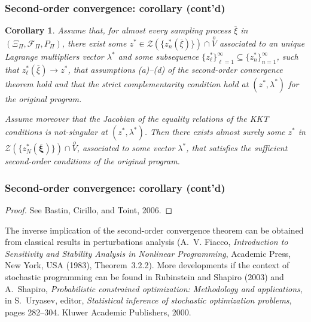 \documentclass{beamer}
\newtheorem{coro}{Corollary}
\def\bxi{\boldsymbol\xi}
\begin{document}
\begin{frame}
\frametitle{Second-order convergence: corollary (cont'd)}

\begin{coro}
Assume that, for almost every sampling process $\overline{\xi}$ in $(\Xi_{\Pi}, \mathcal{F}_{\Pi}, P_{\Pi})$, there exist some $z^* \in \mathcal{Z} \left(\lbrace
  z^*_n(\overline{\xi})\rbrace\right) \cap \overset{o}{V}$ associated to an unique Lagrange multipliers vector $\lambda^*$ and some subsequence
 $\lbrace z_{\ell}^* \rbrace_{\ell = 1}^{\infty} \subseteq \lbrace  z_n^* \rbrace_{n = 1}^{\infty}$, such that $z^*_{\ell}(\overline{\xi}) \rightarrow z^*$, that assumptions (a)--(d) of the second-order convergence theorem hold and that the strict complementarity condition hold at $( z^*, \lambda^* )$ for the original program.

\mbox{}

Assume moreover that the Jacobian of the equality relations of the KKT conditions is not-singular at $( z^*, \lambda^* )$.
Then there exists almost surely some $z^*$ in $\mathcal{Z} \left(
\lbrace z_N^*(\overline{\bxi}) \rbrace \right) \cap \overset{o}{V}$,
associated to some vector $\lambda^*$, that satisfies the sufficient second-order conditions of the original program.
\end{coro}

\end{frame}

\begin{frame}
\frametitle{Second-order convergence: corollary (cont'd)}

\begin{proof}
See Bastin, Cirillo, and Toint, 2006.
\end{proof}

\mbox{}

The inverse implication of the second-order convergence theorem can be obtained from classical results in perturbations analysis (A.~V. Fiacco, {\sl Introduction to Sensitivity and  Stability Analysis in Nonlinear Programming}, Academic Press, New
York, USA (1983), Theorem~3.2.2).
More developments if the context of stochastic programming can be found in  Rubinstein and Shapiro (2003) and A.~Shapiro, {\sl Probabilistic constrained optimization: Methodology and applications}, in S.~Uryasev, editor, {\sl Statistical
  inference of stochastic optimization problems}, pages
282--304. Kluwer Academic Publishers, 2000.

\end{frame}
\end{document}
